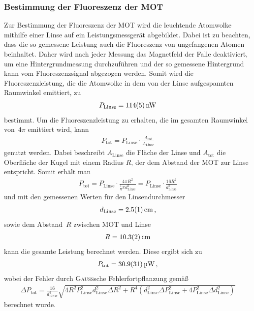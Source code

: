 \documentclass[11pt, a4paper]{article}
\numberwithin{equation}{section}
\begin{document}
\subsubsection{Bestimmung der Fluoreszenz der MOT}
\label{sec:fluoreszenz}
Zur Bestimmung der Fluoreszenz der MOT wird die leuchtende Atomwolke mithilfe einer Linse auf ein Leistungsmessgerät abgebildet.
Dabei ist zu beachten, dass die so gemessene Leistung auch die Fluoreszenz von ungefangenen Atomen beinhaltet.
Daher wird nach jeder Messung das Magnetfeld der Falle deaktiviert, um eine Hintergrundmessung durchzuführen und der so gemessene Hintergrund kann vom Fluoreszenzsignal abgezogen werden.
Somit wird die Fluoreszenzleistung, die die Atomwolke in dem von der Linse aufgespannten Raumwinkel emittiert, zu
\begin{align*}
	P_\mathrm{Linse} = \SI{114 +- 5}{nW}
\end{align*}
bestimmt.
Um die Fluoreszenzleistung zu erhalten, die im gesamten Raumwinkel von~$4\pi$ emittiert wird, kann
\begin{align*}
	P_\mathrm{tot} = P_\mathrm{Linse} \cdot \frac{A_\mathrm{tot}}{A_\mathrm{Linse}}
\end{align*}
genutzt werden.
Dabei beschreibt $A_\mathrm{Linse}$ die Fläche der Linse und $A_\mathrm{tot}$ die Oberfläche der Kugel mit einem Radius $R$, der dem Abstand der MOT zur Linse entspricht.
Somit erhält man
\begin{align*}
	P_\mathrm{tot} = P_\mathrm{Linse} \cdot \frac{4 \pi R^2}{\frac{1}{4} \pi d_\mathrm{Linse}^2} = P_\mathrm{Linse} \cdot \frac{16 R^2}{d_\mathrm{Linse}^2}
\end{align*}
und mit den gemessenen Werten für den Linsendurchmesser
\begin{align*}
	d_\mathrm{Linse} = \SI{2.5 +- 0.1}{cm} \, \text{,}
\end{align*}
sowie dem Abstand~$R$ zwischen MOT und Linse
\begin{align*}
	R = \SI{10.3 +- 0.2}{cm}
\end{align*}
kann die gesamte Leistung berechnet werden.
Diese ergibt sich zu
\begin{align*}
	P_\mathrm{tot} = \SI{30.9 +- 3.1}{\micro\watt} \, \text{,}
\end{align*}
wobei der Fehler durch \textsc{Gauß}sche Fehlerfortpflanzung gemäß
\begin{align*}
	\Delta P_\mathrm{tot} = \frac{16}{d_\mathrm{Linse}^3} \sqrt{4 R^2 P_\mathrm{Linse}^2 d_\mathrm{Linse}^2 \Delta R^2 + R^4 \left( d_\mathrm{Linse}^2 \Delta P_\mathrm{Linse}^2 + 4 P_\mathrm{Linse}^2 \Delta d_\mathrm{Linse}^2 \right)}
\end{align*}
berechnet wurde.
\end{document}
